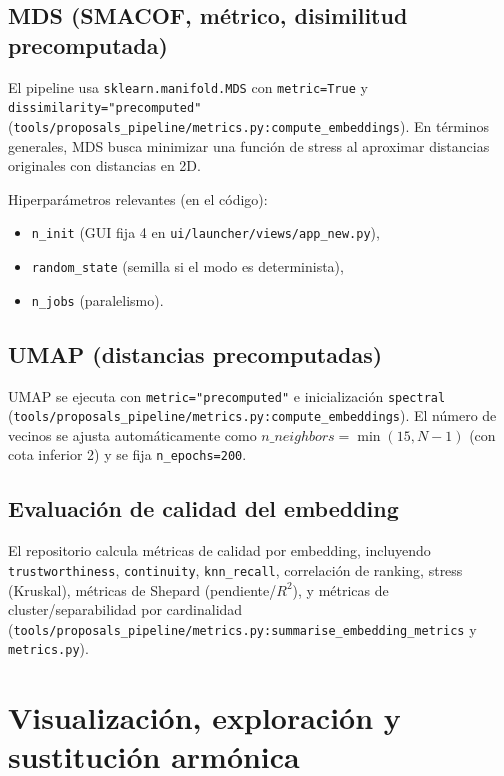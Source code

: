 \subsection{MDS (SMACOF, métrico, disimilitud precomputada)}
El pipeline usa \texttt{sklearn.manifold.MDS} con \texttt{metric=True} y \texttt{dissimilarity="precomputed"} (\texttt{tools/proposals\_pipeline/metrics.py:compute\_embeddings}). En términos generales, MDS busca minimizar una función de stress al aproximar distancias originales con distancias en 2D.

Hiperparámetros relevantes (en el código):
\begin{itemize}
  \item \texttt{n\_init} (GUI fija 4 en \texttt{ui/launcher/views/app\_new.py}),
  \item \texttt{random\_state} (semilla si el modo es determinista),
  \item \texttt{n\_jobs} (paralelismo).
\end{itemize}

\subsection{UMAP (distancias precomputadas)}
UMAP se ejecuta con \texttt{metric="precomputed"} e inicialización \texttt{spectral} (\texttt{tools/proposals\_pipeline/metrics.py:compute\_embeddings}). El número de vecinos se ajusta automáticamente como $n\_neighbors=\min(15,N-1)$ (con cota inferior 2) y se fija \texttt{n\_epochs=200}.

\subsection{Evaluación de calidad del embedding}
El repositorio calcula métricas de calidad por embedding, incluyendo \texttt{trustworthiness}, \texttt{continuity}, \texttt{knn\_recall}, correlación de ranking, stress (Kruskal), métricas de Shepard (pendiente/$R^2$), y métricas de cluster/separabilidad por cardinalidad (\texttt{tools/proposals\_pipeline/metrics.py:summarise\_embedding\_metrics} y \texttt{metrics.py}).

\section{Visualización, exploración y sustitución armónica}
\label{sec:visualizacion}

